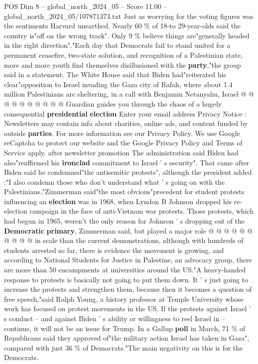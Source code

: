 \begin{textsample}{POS Dim 8 – global\_north\_2024\_05 – Score 11.00 – global\_north\_2024\_05/107871373.txt}
Just as worrying for the voting figures was the sentiments Harvard unearthed.
Nearly 60 \% of 18-to 29-year-olds said the country is"off on the wrong track".
Only 9 \% believe things are"generally headed in the right direction"."Each day that Democrats fail to stand united for a permanent ceasefire, two-state solution, and recognition of a Palestinian state, more and more youth find themselves disillusioned with the \textbf{party},"the group said in a statement.
The White House said that Biden had"reiterated his clear"opposition to Israel invading the Gaza city of Rafah, where about 1.4 million Palestinians are sheltering, in a call with Benjamin Netanyahu, Israel @ @ @ @ @ @ @ @ @ @ Guardian guides you through the chaos of a hugely consequential \textbf{presidential} \textbf{election} Enter your email address Privacy Notice : Newsletters may contain info about charities, online ads, and content funded by outside \textbf{parties}.
For more information see our Privacy Policy.
We use Google reCaptcha to protect our website and the Google Privacy Policy and Terms of Service apply. after newsletter promotion The administration said Biden had also"reaffirmed his \textbf{ironclad} commitment to Israel ' s security".
That came after Biden said he condemned"the antisemitic protests", although the president added :"I also condemn those who don't understand what ' s going on with the Palestinians."Zimmerman said"the most obvious"precedent for student protests influencing an \textbf{election} was in 1968, when Lyndon B Johnson dropped his re-election campaign in the face of anti-Vietnam war protests.
Those protests, which had begun in 1965, weren't the only reason for Johnson ' s dropping out of the \textbf{Democratic} \textbf{primary}, Zimmerman said, but played a major role @ @ @ @ @ @ @ @ @ @ in scale than the current demonstrations, although with hundreds of students arrested so far, there is evidence the movement is growing, and according to National Students for Justice in Palestine, an advocacy group, there are more than 50 encampments at universities around the US."A heavy-handed response to protests is basically not going to put them down.
It ' s just going to increase the protests and strengthen them, because then it becomes a question of free speech,"said Ralph Young, a history professor at Temple University whose work has focused on protest movements in the US.
If the protests against Israel ' s conduct -- and against Biden ' s ability or willingness to reel Israel in -- continue, it will not be an issue for Trump.
In a Gallup \textbf{poll} in March, 71 \% of Republicans said they approved of"the military action Israel has taken in Gaza", compared with just 36 \% of Democrats."The main negativity on this is for the Democrats.

\end{textsample}
